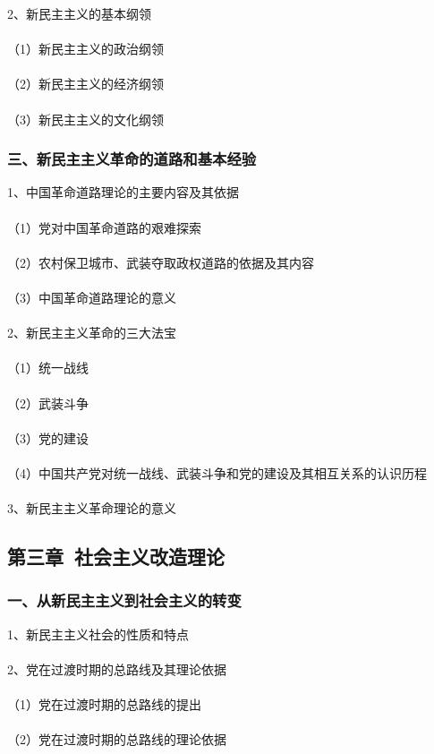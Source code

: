 \documentclass{ctexart}
\begin{document}
2、新民主主义的基本纲领
\\\\
（1）新民主主义的政治纲领
\\\\
（2）新民主主义的经济纲领
\\\\
（3）新民主主义的文化纲领

\subsubsection{三、新民主主义革命的道路和基本经验}
1、中国革命道路理论的主要内容及其依据
\\\\
（1）党对中国革命道路的艰难探索
\\\\
（2）农村保卫城市、武装夺取政权道路的依据及其内容
\\\\
（3）中国革命道路理论的意义
\\\\

2、新民主主义革命的三大法宝
\\\\
（1）统一战线
\\\\
（2）武装斗争
\\\\
（3）党的建设
\\\\
（4）中国共产党对统一战线、武装斗争和党的建设及其相互关系的认识历程
\\\\

3、新民主主义革命理论的意义

\subsection{第三章\ 社会主义改造理论}
\subsubsection{一、从新民主主义到社会主义的转变}
1、新民主主义社会的性质和特点
\\\\

2、党在过渡时期的总路线及其理论依据
\\\\
（1）党在过渡时期的总路线的提出
\\\\
（2）党在过渡时期的总路线的理论依据
\end{document}
